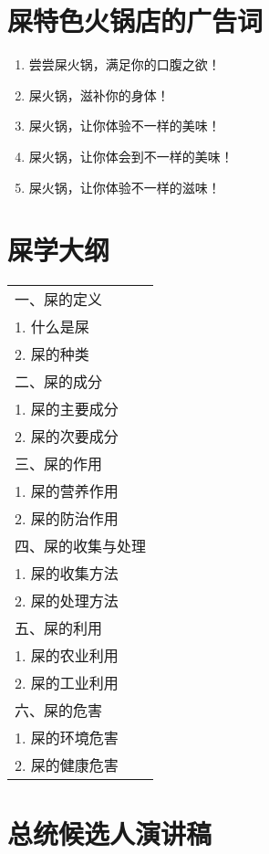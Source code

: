 \documentclass[titlepage,oneside]{ctexbook}
\begin{document}
\chapter{屎特色火锅店的广告词}
\begin{enumerate}
    \item 尝尝屎火锅，满足你的口腹之欲！
    \item 屎火锅，滋补你的身体！
    \item 屎火锅，让你体验不一样的美味！
    \item 屎火锅，让你体会到不一样的美味！
    \item 屎火锅，让你体验不一样的滋味！
\end{enumerate}

\chapter{屎学大纲}
\begin{center}
    
    \begin{tabular}{l}
        一、屎的定义 \\
        1. 什么是屎 \\
        2. 屎的种类 \\
        二、屎的成分 \\
        1. 屎的主要成分 \\
        2. 屎的次要成分 \\
        三、屎的作用 \\
        1. 屎的营养作用 \\
        2. 屎的防治作用 \\
        四、屎的收集与处理 \\
        1. 屎的收集方法 \\
        2. 屎的处理方法 \\
        五、屎的利用 \\
        1. 屎的农业利用 \\
        2. 屎的工业利用 \\
        六、屎的危害 \\
        1. 屎的环境危害 \\
        2. 屎的健康危害 \\
    \end{tabular}
\end{center}

\chapter{总统候选人演讲稿}
\end{document}

